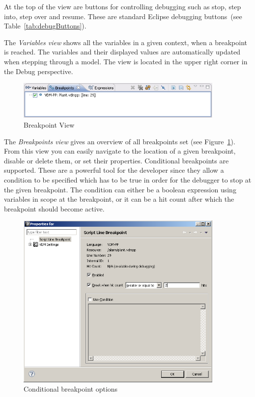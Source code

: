 At the top of the view are buttons for controlling debugging such as stop, step
into, step over and resume. These are standard Eclipse debugging
buttons~(see Table~\ref{tab:debugButtons}).

The \emph{Variables view} shows all the variables in a given context,
when a breakpoint is reached. The variables and their displayed values
are automatically updated when stepping through a model. The view is
located in the upper right corner in the Debug perspective.


\begin{figure}[htp]
\begin{center}
  \includegraphics[width=4in]{figures/BreakpointView}
  \caption{Breakpoint View}
  \label{fig:BreakpointView}
\end{center}
\end{figure}

The \emph{Breakpoints view} gives an overview of all breakpoints set
(see Figure~\ref{fig:BreakpointView}). From this view you
can easily navigate to the location of a given breakpoint, disable or
delete them, or set their properties. 
Conditional breakpoints are supported. These are a powerful tool for
the developer since they allow a condition to be specified which has
to be true in order for the debugger to stop at the given
breakpoint. The condition can either be a boolean expression using
variables in scope at the breakpoint, or it can be a hit count after
which the breakpoint should become active.

\begin{figure}[htp]
\begin{center}
  \includegraphics[width=4in]{figures/Breakpointconditional}
  \caption{Conditional breakpoint options}
  \label{fig:BreakpointConditional}
\end{center}
\end{figure}

